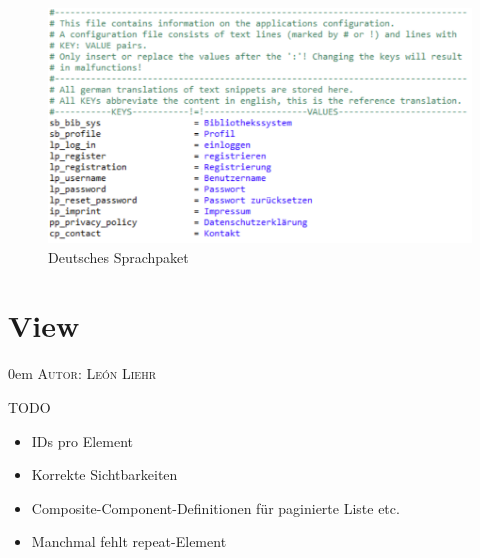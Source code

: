\documentclass{article}
\makeatletter
\newcommand{\sectionauthor}[1]{
	{\parindent 0em \large \scshape Autor: #1 \par \nobreak \vspace*{1em}}
	\@afterheading
}
\makeatother
\begin{document}
\begin{figure}  
\hypertarget{messagesde}{}
\centering
\includegraphics[width=60em]{messagesde}
\caption{Deutsches Sprachpaket}
\end{figure}
\restoregeometry


\section{View}
\sectionauthor{León Liehr}

TODO

\begin{itemize}
    \item IDs pro Element
    \item Korrekte Sichtbarkeiten
    \item Composite-Component-Definitionen für paginierte Liste etc.
    \item Manchmal fehlt repeat-Element
\end{itemize}

\newcommand{\M}[1]{\texttt{#1}} %
\newcommand{\tag}[2]{\M{#1:#2}} %
\newcommand{\B}[1]{\#\{#1\}} %
\newcommand{\MB}[1]{\M{\B{#1}}} %

\renewenvironment{controls}
{
    \begin{table}[H]
        \centering
        \begin{tabular}{ p{7em} p{25em} p{7em} }
            \toprule
            \textbf{Typ} & \textbf{Beschreibung} & \textbf{Sichtbarkeit}\\
            \midrule
        }
        {
            \bottomrule
        \end{tabular}
    \end{table}
}
\end{document}
